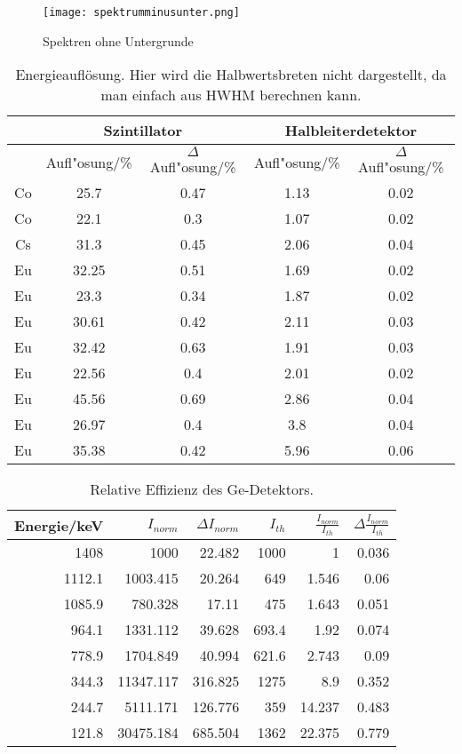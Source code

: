 \documentclass[ngerman,11pt]{article}
\begin{document}
\begin{figure}[htbp]
	\centering
	\texttt{[image: spektrumminusunter.png]}
	\caption{Spektren ohne Untergrunde}
	\label{fig:spektrummunusunter}
\end{figure}
\begin{table}[htbp]
	\centering
	\begin{tabular}{|c|c|c|c|c|}
		\hline
		&
		\multicolumn{2}{c|}{Szintillator} &
		\multicolumn{2}{c|}{Halbleiterdetektor} \\ \hline
		& {Aufl"osung/\%} &
		{$\Delta$Aufl"osung/\%} &
		{Aufl"osung/\%} &
		{$\Delta$Aufl"osung/\%} \\ \hline
		Co & 25.7  & 0.47 & 1.13 & 0.02 \\ \hline
		Co & 22.1  & 0.3  & 1.07 & 0.02 \\ \hline
		Cs & 31.3  & 0.45 & 2.06 & 0.04 \\ \hline
		Eu & 32.25 & 0.51 & 1.69 & 0.02 \\ \hline
		Eu & 23.3  & 0.34 & 1.87 & 0.02 \\ \hline
		Eu & 30.61 & 0.42 & 2.11 & 0.03 \\ \hline
		Eu & 32.42 & 0.63 & 1.91 & 0.03 \\ \hline
		Eu & 22.56 & 0.4  & 2.01 & 0.02 \\ \hline
		Eu & 45.56 & 0.69 & 2.86 & 0.04 \\ \hline
		Eu & 26.97 & 0.4  & 3.8  & 0.04 \\ \hline
		Eu & 35.38 & 0.42 & 5.96 & 0.06 \\ \hline
	\end{tabular}
\caption{Energieaufl\"osung. Hier wird die Halbwertsbreten nicht dargestellt, da man einfach aus HWHM berechnen kann.}
\label{tab:auflosung}
\end{table}
\begin{table}[htbp]
\centering
	\begin{tabular}{|r|r|r|r|r|r|}
		\hline
		{Energie/keV} &
		{$I_{norm}$} &
		{$\Delta I_{norm}$} &
		{$I_{th}$} &
		{$\frac{I_{norm}}{I_{th}}$} &
		{$\Delta\frac{I_{norm}}{I_{th}} $} \\ \hline
		1408   & 1000      & 22.482  & 1000  & 1      & 0.036 \\ \hline
		1112.1 & 1003.415  & 20.264  & 649   & 1.546  & 0.06  \\ \hline
		1085.9 & 780.328   & 17.11   & 475   & 1.643  & 0.051 \\ \hline
		964.1  & 1331.112  & 39.628  & 693.4 & 1.92   & 0.074 \\ \hline
		778.9  & 1704.849  & 40.994  & 621.6 & 2.743  & 0.09  \\ \hline
		344.3  & 11347.117 & 316.825 & 1275  & 8.9    & 0.352 \\ \hline
		244.7  & 5111.171  & 126.776 & 359   & 14.237 & 0.483 \\ \hline
		121.8  & 30475.184 & 685.504 & 1362  & 22.375 & 0.779 \\ \hline
	\end{tabular}
\caption{Relative Effizienz des Ge-Detektors.}
\label{tab:relative}
\end{table}
\end{document}
